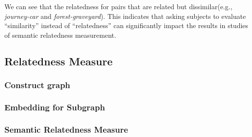 We can see that the relatedness for pairs that are related but
dissimilar(e.g., \emph{journey-car} and \emph{forest-graveyard}). 
This indicates that asking subjects to evaluate “similarity” instead of “relatedness” can
significantly impact the results in studies of semantic relatedness measurement.

\subsection{Relatedness Measure}
\subsubsection{Construct graph}
\subsubsection{Embedding for Subgraph}
\subsubsection{Semantic Relatedness Measure}

